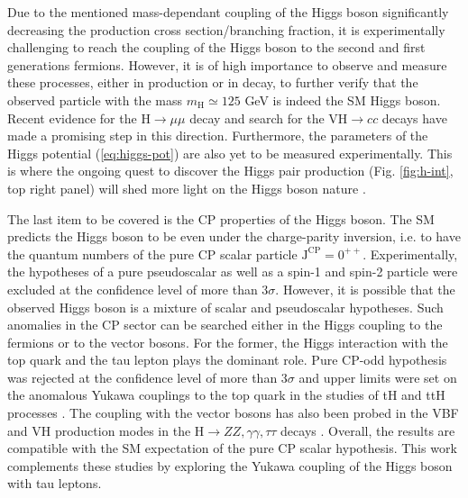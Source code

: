 Due to the mentioned mass-dependant coupling of the Higgs boson significantly decreasing the production cross section/branching fraction, it is experimentally challenging to reach the coupling of the Higgs boson to the second and first generations fermions. However, it is of high importance to observe and measure these processes, either in production or in decay,  to further verify that the observed particle with the mass $m_\text{H} \simeq 125$ GeV is indeed the SM Higgs boson. Recent evidence for the $\text{H} \to \mu\mu$ decay \cite{CMS:2020xwi} and search for the $\text{VH} \to cc$ decays \cite{CMS:2022psv} have made a promising step in this direction. Furthermore, the parameters of the Higgs potential (\ref{eq:higgs-pot}) are also yet to be measured experimentally. This is where the ongoing quest to discover the Higgs pair production (Fig. \ref{fig:h-int}, top right panel) will shed more light on the Higgs boson nature \cite{CMS:2022dwd}. 

The last item to be covered is the CP properties of the Higgs boson. The SM predicts the Higgs boson to be even under the charge-parity inversion, i.e. to have the quantum numbers of the pure CP scalar particle $\text{J}^\text{CP} = 0^{++}$. Experimentally, the hypotheses of a pure pseudoscalar as well as a spin-1 and spin-2 particle were excluded \cite{CMS:2013fjq, ATLAS:2015zhl} at the confidence level of more than $3\sigma$. However, it is possible that the observed Higgs boson is a mixture of scalar and pseudoscalar hypotheses. Such anomalies in the CP sector can be searched either in the Higgs coupling to the fermions or to the vector bosons. For the former, the Higgs interaction with the top quark and the tau lepton plays the dominant role. Pure CP-odd hypothesis was rejected at the confidence level of more than $3\sigma$ and upper limits were set on the anomalous Yukawa couplings to the top quark in the studies of tH and ttH processes \cite{CMS:2020cga, ATLAS:2020ior, CMS:2022dbt,ATLAS:2022ngt}. The coupling with the vector bosons has also been probed in the VBF and VH production modes in the $\text{H}\to ZZ, \gamma\gamma, \tau\tau$ decays \cite{CMS:2021nnc, Collaboration:2022mlq,ATLAS:2022tan, ATLAS:2022fnp}. Overall, the results are compatible with the SM expectation of the pure CP scalar hypothesis. This work complements these studies by exploring the Yukawa coupling of the Higgs boson with tau leptons.